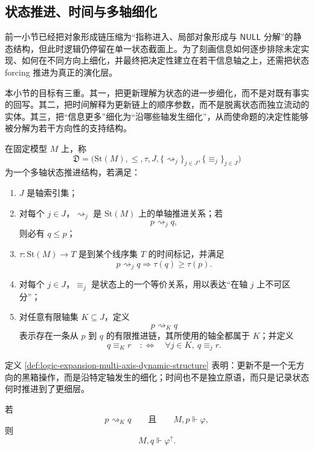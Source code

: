\subsection{状态推进、时间与多轴细化}\label{subsec:logic-expansion-chain-dynamics-time-multiaxis}

前一小节已经把对象形成链压缩为“指称进入、局部对象形成与 \(\mathsf{NULL}\) 分解”的静态结构，但此时逻辑仍停留在单一状态截面上。为了刻画信息如何逐步排除未定实现、如何在不同方向上细化，并最终把决定性建立在若干信息轴之上，还需把状态 forcing 推进为真正的演化层。

本小节的目标有三重。其一，把更新理解为状态的进一步细化，而不是对既有事实的回写。其二，把时间解释为更新链上的顺序参数，而不是脱离状态而独立流动的实体。其三，把“信息更多”细化为“沿哪些轴发生细化”，从而使命题的决定性能够被分解为若干方向性的支持结构。

\begin{definition}[多轴状态推进结构]\label{def:logic-expansion-multi-axis-dynamic-structure}
在固定模型 \(M\) 上，称
\[
\mathfrak{D}
=
\bigl(\mathrm{St}(M),\le,\tau,J,\{\rightsquigarrow_j\}_{j\in J},\{\equiv_j\}_{j\in J}\bigr)
\]
为一个多轴状态推进结构，若满足：
\begin{enumerate}
  \item \(J\) 是轴索引集；
  \item 对每个 \(j\in J\)，\(\rightsquigarrow_j\) 是 \(\mathrm{St}(M)\) 上的单轴推进关系；若
  \[
  p\rightsquigarrow_j q,
  \]
  则必有 \(q\le p\)；
  \item \(\tau:\mathrm{St}(M)\to T\) 是到某个线序集 \(T\) 的时间标记，并满足
  \[
  p\rightsquigarrow_j q
  \Longrightarrow
  \tau(q)\ge \tau(p).
  \]
  \item 对每个 \(j\in J\)，\(\equiv_j\) 是状态上的一个等价关系，用以表达“在轴 \(j\) 上不可区分”；
  \item 对任意有限轴集 \(K\subseteq J\)，定义
  \[
  p\rightsquigarrow_K q
  \]
  表示存在一条从 \(p\) 到 \(q\) 的有限推进链，其所使用的轴全都属于 \(K\)；并定义
  \[
  q\equiv_K r
  \quad:\Longleftrightarrow\quad
  \forall j\in K,\ q\equiv_j r.
  \]
\end{enumerate}
\end{definition}

定义 \ref{def:logic-expansion-multi-axis-dynamic-structure} 表明：更新不是一个无方向的黑箱操作，而是沿特定轴发生的细化；时间也不是独立原语，而只是记录状态何时推进到了更细层。

\begin{proposition}\label{prop:logic-expansion-updates-preserve-forcing}
若
\[
p\rightsquigarrow_K q
\qquad\text{且}\qquad
M,p\Vdash \varphi,
\]
则
\[
M,q\Vdash \varphi^\uparrow.
\]
\end{proposition}

